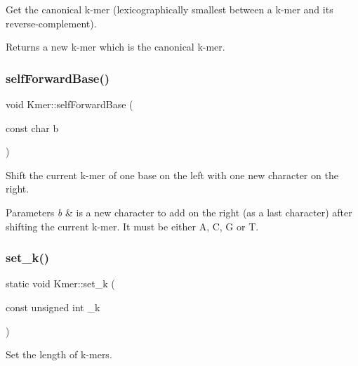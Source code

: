 Get the canonical k-\/mer (lexicographically smallest between a k-\/mer and its reverse-\/complement). 

\begin{DoxyReturn}{Returns}
a new k-\/mer which is the canonical k-\/mer. 
\end{DoxyReturn}
\mbox{\label{classKmer_a605ec250880652507ae279f348046936}} 
\subsubsection{\texorpdfstring{self\+Forward\+Base()}{selfForwardBase()}}
{\footnotesize\ttfamily void Kmer\+::self\+Forward\+Base (\begin{DoxyParamCaption}\item[{const char}]{b }\end{DoxyParamCaption})}



Shift the current k-\/mer of one base on the left with one new character on the right. 


\begin{DoxyParams}{Parameters}
{\em b} & is a new character to add on the right (as a last character) after shifting the current k-\/mer. It must be either \textquotesingle{}A\textquotesingle{}, \textquotesingle{}C\textquotesingle{}, \textquotesingle{}G\textquotesingle{} or \textquotesingle{}T\textquotesingle{}. \\
\hline
\end{DoxyParams}
\mbox{\label{classKmer_ae76504dbc6fe791fadc50667852a62c8}} 
\subsubsection{\texorpdfstring{set\+\_\+k()}{set\_k()}}
{\footnotesize\ttfamily static void Kmer\+::set\+\_\+k (\begin{DoxyParamCaption}\item[{const unsigned int}]{\+\_\+k }\end{DoxyParamCaption})\hspace{0.3cm}{\ttfamily [static]}}



Set the length of k-\/mers. 


